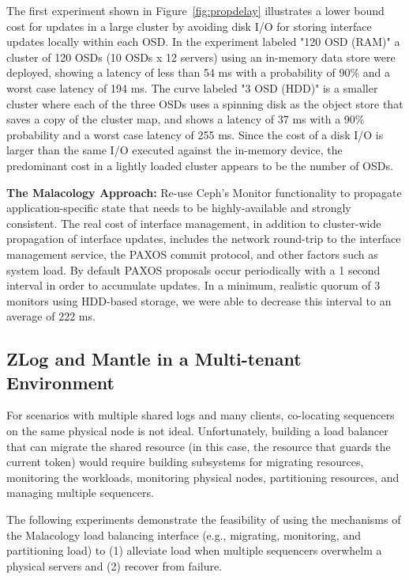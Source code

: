 \documentclass[preprint]{sigplanconf-eurosys}
\begin{document}
The first experiment shown in Figure~\ref{fig:propdelay} illustrates a lower
bound cost for updates in a large cluster by avoiding disk I/O for storing
interface updates locally within each OSD.  In the experiment labeled "120 OSD
(RAM)" a cluster of 120 OSDs (10 OSDs x 12 servers) using an in-memory data
store were deployed, showing a latency of less than 54 ms with a probability
of 90\% and a worst case latency of 194 ms. The curve labeled "3 OSD (HDD)" is
a smaller cluster where each of the three OSDs uses a spinning disk as the
object store that saves a copy of the cluster map, and shows a latency of 37
ms with a 90\% probability and a worst case latency of 255 ms. Since the cost
of a disk I/O is larger than the same I/O executed against the in-memory
device, the predominant cost in a lightly loaded cluster appears to be the
number of OSDs.

\textbf{The Malacology Approach:} Re-use Ceph's Monitor functionality to
propagate application-specific state that needs to be highly-available and
strongly consistent.  The real cost of interface management, in addition to
cluster-wide propagation of interface updates, includes the network round-trip
to the interface management service, the PAXOS commit protocol, and other
factors such as system load. By default PAXOS proposals occur periodically with
a 1 second interval in order to accumulate updates. In a minimum, realistic
quorum of 3 monitors using HDD-based storage, we were able to decrease this
interval to an average of 222 ms.

\subsection{ZLog and Mantle in a Multi-tenant Environment}

For scenarios with multiple shared logs and many clients, co-locating
sequencers on the same physical node is not ideal. Unfortunately, building a
load balancer that can migrate the shared resource (in this case, the resource
that guards the current token) would require building subsystems for migrating
resources, monitoring the workloads, monitoring physical nodes, partitioning
resources, and managing multiple sequencers.

The following experiments demonstrate the feasibility of using the mechanisms
of the Malacology load balancing interface (e.g., migrating, monitoring, and
partitioning load) to (1) alleviate load when multiple sequencers overwhelm a
physical servers and (2) recover from failure.
\end{document}
